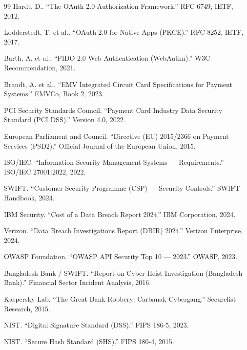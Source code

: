 \begin{thebibliography}{99}
\label{ref:13}
Hardt, D.. ``The OAuth 2.0 Authorization Framework.'' RFC 6749, IETF, 2012.

\label{ref:14}
Lodderstedt, T. et al.. ``OAuth 2.0 for Native Apps (PKCE).'' RFC 8252, IETF, 2017.

\label{ref:15}
Barth, A. et al.. ``FIDO 2.0 Web Authentication (WebAuthn).'' W3C Recommendation, 2021.

\label{ref:16}
Brandt, A. et al.. ``EMV Integrated Circuit Card Specifications for Payment Systems.'' EMVCo, Book 2, 2023.

\label{ref:17}
PCI Security Standards Council. ``Payment Card Industry Data Security Standard (PCI DSS).'' Version 4.0, 2022.

\label{ref:18}
European Parliament and Council. ``Directive (EU) 2015/2366 on Payment Services (PSD2).'' Official Journal of the European Union, 2015.

\label{ref:19}
ISO/IEC. ``Information Security Management Systems --- Requirements.'' ISO/IEC 27001:2022, 2022.

\label{ref:20}
SWIFT. ``Customer Security Programme (CSP) --- Security Controls.'' SWIFT Handbook, 2024.

\label{ref:21}
IBM Security. ``Cost of a Data Breach Report 2024.'' IBM Corporation, 2024.

\label{ref:22}
Verizon. ``Data Breach Investigations Report (DBIR) 2024.'' Verizon Enterprise, 2024.

\label{ref:23}
OWASP Foundation. ``OWASP API Security Top 10 --- 2023.'' OWASP, 2023.

\label{ref:24}
Bangladesh Bank / SWIFT. ``Report on Cyber Heist Investigation (Bangladesh Bank).'' Financial Sector Incident Analysis, 2016.

\label{ref:25}
Kaspersky Lab. ``The Great Bank Robbery: Carbanak Cybergang.'' Securelist Research, 2015.

\label{ref:26}
NIST. ``Digital Signature Standard (DSS).'' FIPS 186-5, 2023.

\label{ref:27}
NIST. ``Secure Hash Standard (SHS).'' FIPS 180-4, 2015.


\end{thebibliography}
